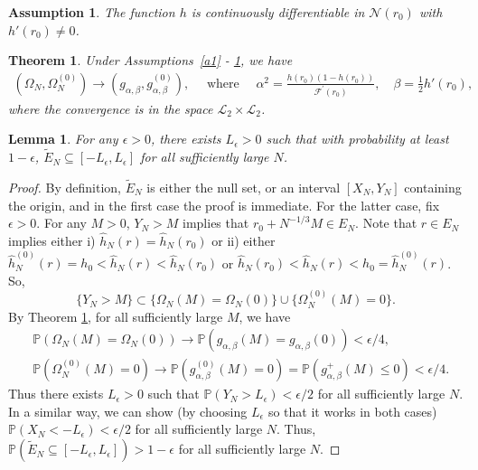 \documentclass[10pt,a4paper]{amsart}
\newtheorem{assumption}{Assumption}
\newtheorem{theorem}{Theorem}
\newtheorem{lemma}{Lemma}
\begin{document}
\begin{assumption}\label{a4}
    The function $h$ is continuously differentiable in $\mathcal{N}(r_0)$ with $h'(r_0) \neq 0$.
\end{assumption}

\begin{theorem}\label{thm2} Under Assumptions~\ref{a1} - \ref{a4}, we have
\begin{align*}
    \left(\Omega_N, \Omega^{(0)}_N\right) {\to} \left(g_{\alpha,\beta}, g^{(0)}_{\alpha,\beta}\right), \quad \text{ where } \quad 
    \alpha^2 = \frac{h\left(r_{0}\right)\left(1-h\left(r_{0}\right)\right)}{\mathcal{F}^\prime\left(r_{0}\right)}, \quad \beta = \frac{1}{2}h'(r_0),
\end{align*}
where the convergence is 
in the space $\mathcal{L}_2 \times \mathcal{L}_2$.
\end{theorem}

\begin{lemma}\label{lem1}
    For any $\epsilon > 0$, there exists $L_\epsilon > 0$ such that with probability at least $1-\epsilon$, $\widetilde{E}_{N} \subseteq [-L_\epsilon,L_\epsilon]$ for all sufficiently large $N$.
\end{lemma}

\begin{proof}
By definition, $\widetilde{E}_{N}$ is either the null set, or an interval $[X_N, Y_N]$ containing the origin, and in the first case the proof is immediate. For the latter case, fix $\epsilon > 0$. 
For any $M > 0$, $Y_N > M$ implies that $r_0 + N^{-1/3}M \in E_N$. Note that $r \in E_N$ implies either i) $\hat{h}_N(r) = \hat{h}_N(r_0)$ or ii) either $\hat{h}^{(0)}_N(r) = h_0 < \hat{h}_N(r) < \hat{h}_N(r_0)$ or $\hat{h}_N(r_0) < \hat{h}_N(r) < h_0 = \hat{h}^{(0)}_N(r)$. So,
\begin{equation*}
\{Y_N > M\} \subset  \{\Omega_N(M) = \Omega_N(0)\} \cup  \{\Omega^{(0)}_N(M) = 0\}.
\end{equation*}
By Theorem \ref{thm2}, for all sufficiently large $M$, we have
\begin{align*}&\mathbb{P}(\Omega_N(M) = \Omega_N(0)) \to \mathbb{P}(g_{\alpha,\beta}(M) = g_{\alpha,\beta}(0)) < \epsilon/4, \\
&\mathbb{P}(\Omega^{(0)}_N(M) = 0) \to \mathbb{P}(g^{(0)}_{\alpha,\beta}(M) = 0) = \mathbb{P}(g^+_{\alpha,\beta}(M) \leq 0)  < \epsilon/4.\end{align*}
Thus there exists $L_\epsilon > 0$ such that $\mathbb{P}(Y_N > L_{\epsilon}) < \epsilon/2$ for all sufficiently large $N$. In a similar way, we can show (by choosing $L_\epsilon$ so that it works in both cases) $\mathbb{P}(X_N < -L_{\epsilon}) < \epsilon/2$ for all sufficiently large $N$. Thus, $\mathbb{P}(\widetilde{E}_{N} \subseteq [-L_\epsilon,L_\epsilon]) > 1-\epsilon$ for all sufficiently large $N$.
\end{proof}
\end{document}

